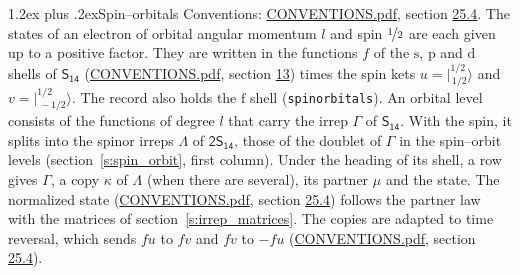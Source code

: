 \documentclass[10pt,a4paper]{article}
\makeatletter
\renewcommand\section{\@startsection{section}{1}{\z@}{-3ex plus -1ex minus -.2ex}%
  {1.2ex plus .2ex}{\normalfont\large\sffamily\bfseries\color{parttitle}}}
\numberwithin{equation}{section}
\newcommand{\grp}[1]{\mathsf{#1}}
\newcommand{\orbital}[1]{\mathrm{#1}}
\newcommand{\mult}{\kappa}
\newcommand{\intx}{\mu}
\newcommand{\jm}[2]{\bigl\lvert{}^{#1}_{\,#2}\bigr\rangle}
\makeatother
\begin{document}
\section{Spin--orbitals}\label{s:spin_orbitals}
Conventions: \href{../../CONVENTIONS.pdf}{CONVENTIONS.pdf}, section \href{../../CONVENTIONS.pdf\#conv.25.4}{25.4}.
\leavevmode\label{n:index.orbital.l}The states of an electron of orbital angular momentum $l$ and spin $\nicefrac{1}{2}$ are each given up to a positive factor. \label{n:local.spinor.uv}\label{n:local.function.f}They are written in the functions $f$ of the $\orbital{s}$, $\orbital{p}$ and $\orbital{d}$ shells of \href{../../../rotation/data/pdf/S14.pdf}{$\grp{S_{14}}$} (\href{../../CONVENTIONS.pdf}{CONVENTIONS.pdf}, section \href{../../../rotation/CONVENTIONS.pdf\#conv.13}{13}) times the spin kets $u = \jm{1/2}{1/2}$ and $v = \jm{1/2}{-1/2}$. The record also holds the $\orbital{f}$ shell (\texttt{spinorbitals}). An orbital level consists of the functions of degree $l$ that carry the irrep $\Gamma$ of \href{../../../rotation/data/pdf/S14.pdf}{$\grp{S_{14}}$}. With the spin, it splits into the spinor irreps $\Lambda$ of $\grp{2S_{14}}$, those of the doublet of $\Gamma$ in the spin--orbit levels (section~\ref{s:spin_orbit}, first column). \label{n:head.state}Under the heading of its shell, a row gives $\Gamma$, a copy $\mult$ of $\Lambda$ (when there are several), its partner $\intx$ and the state. The normalized state (\href{../../CONVENTIONS.pdf}{CONVENTIONS.pdf}, section \href{../../CONVENTIONS.pdf\#conv.25.4}{25.4}) follows the partner law with the matrices of section~\ref{s:irrep_matrices}. The copies are adapted to time reversal, which sends $f u$ to $f v$ and $f v$ to $-f u$ (\href{../../CONVENTIONS.pdf}{CONVENTIONS.pdf}, section \href{../../CONVENTIONS.pdf\#conv.25.4}{25.4}).
\end{document}
